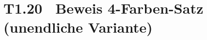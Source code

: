 \documentclass[fontsize=11pt, twoside=false, numbers=autoenddot]{scrbook}
\begin{document}
%

\section*{T1.20~ Beweis 4-Farben-Satz (unendliche Variante)}
\end{document}
